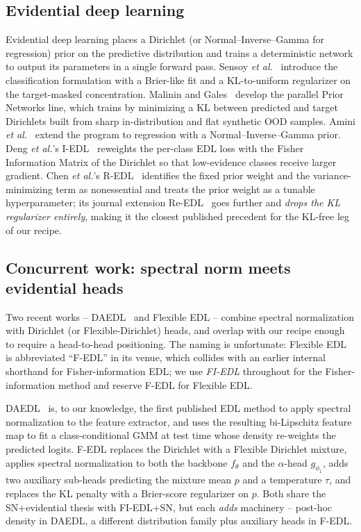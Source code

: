 \documentclass[review,5p,times]{elsarticle}
\begin{document}
\subsection{Evidential deep learning}\label{sec:rw-edl}
Evidential deep learning places a Dirichlet (or Normal--Inverse--Gamma for
regression) prior on the predictive distribution and trains a deterministic
network to output its parameters in a single forward pass. Sensoy
\textit{et al.}~\citep{sensoy2018edl} introduce the classification
formulation with a Brier-like fit and a KL-to-uniform regularizer on the
target-masked concentration. Malinin and Gales~\citep{malinin2018prior}
develop the parallel Prior Networks line, which trains by minimizing a KL
between predicted and target Dirichlets built from sharp in-distribution
and flat synthetic OOD samples. Amini \textit{et al.}~\citep{amini2020evidential}
extend the program to regression with a Normal--Inverse--Gamma prior.
Deng \textit{et al.}'s I-EDL~\citep{deng2023iedl} reweights the per-class
EDL loss with the Fisher Information Matrix of the Dirichlet so that
low-evidence classes receive larger gradient. Chen \textit{et al.}'s
R-EDL~\citep{chen2024redl} identifies the fixed prior weight and the
variance-minimizing term as nonessential and treats the prior weight as a
tunable hyperparameter; its journal extension Re-EDL~\citep{chen2025reedl}
goes further and \emph{drops the KL regularizer entirely}, making it the
closest published precedent for the KL-free leg of our recipe.

\subsection{Concurrent work: spectral norm meets evidential
heads}\label{sec:rw-concurrent}
Two recent works -- DAEDL~\citep{yoon2024daedl} and Flexible EDL
\citep{yoon2025fedl} -- combine spectral normalization with Dirichlet (or
Flexible-Dirichlet) heads, and overlap with our recipe enough to require a
head-to-head positioning. The naming is unfortunate: Flexible EDL is
abbreviated ``F-EDL'' in its venue, which collides with an earlier internal
shorthand for Fisher-information EDL; we use \emph{FI-EDL} throughout for
the Fisher-information method and reserve F-EDL for Flexible EDL.

DAEDL~\citep{yoon2024daedl} is, to our knowledge, the first published EDL
method to apply spectral normalization to the feature extractor, and uses
the resulting bi-Lipschitz feature map to fit a class-conditional GMM at
test time whose density re-weights the predicted logits. F-EDL
\citep{yoon2025fedl} replaces the Dirichlet with a Flexible Dirichlet
mixture, applies spectral normalization to both the backbone $f_\theta$
and the $\alpha$-head $g_{\phi_1}$, adds two auxiliary sub-heads predicting
the mixture mean $p$ and a temperature $\tau$, and replaces the KL penalty
with a Brier-score regularizer on $p$. Both share the SN+evidential thesis
with FI-EDL+SN, but each \emph{adds} machinery -- post-hoc density in
DAEDL, a different distribution family plus auxiliary heads in F-EDL.
\end{document}
